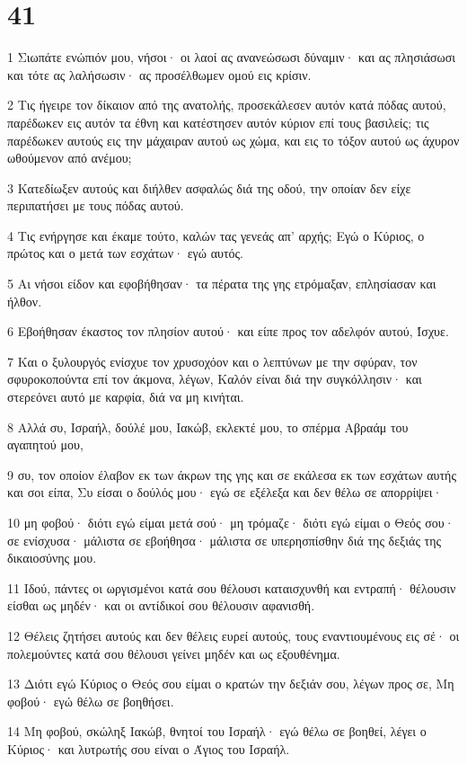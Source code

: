 \chapter{41}

\par 1 Σιωπάτε ενώπιόν μου, νήσοι· οι λαοί ας ανανεώσωσι δύναμιν· και ας πλησιάσωσι και τότε ας λαλήσωσιν· ας προσέλθωμεν ομού εις κρίσιν.
\par 2 Τις ήγειρε τον δίκαιον από της ανατολής, προσεκάλεσεν αυτόν κατά πόδας αυτού, παρέδωκεν εις αυτόν τα έθνη και κατέστησεν αυτόν κύριον επί τους βασιλείς; τις παρέδωκεν αυτούς εις την μάχαιραν αυτού ως χώμα, και εις το τόξον αυτού ως άχυρον ωθούμενον από ανέμου;
\par 3 Κατεδίωξεν αυτούς και διήλθεν ασφαλώς διά της οδού, την οποίαν δεν είχε περιπατήσει με τους πόδας αυτού.
\par 4 Τις ενήργησε και έκαμε τούτο, καλών τας γενεάς απ' αρχής; Εγώ ο Κύριος, ο πρώτος και ο μετά των εσχάτων· εγώ αυτός.
\par 5 Αι νήσοι είδον και εφοβήθησαν· τα πέρατα της γης ετρόμαξαν, επλησίασαν και ήλθον.
\par 6 Εβοήθησαν έκαστος τον πλησίον αυτού· και είπε προς τον αδελφόν αυτού, Ίσχυε.
\par 7 Και ο ξυλουργός ενίσχυε τον χρυσοχόον και ο λεπτύνων με την σφύραν, τον σφυροκοπούντα επί τον άκμονα, λέγων, Καλόν είναι διά την συγκόλλησιν· και στερεόνει αυτό με καρφία, διά να μη κινήται.
\par 8 Αλλά συ, Ισραήλ, δούλέ μου, Ιακώβ, εκλεκτέ μου, το σπέρμα Αβραάμ του αγαπητού μου,
\par 9 συ, τον οποίον έλαβον εκ των άκρων της γης και σε εκάλεσα εκ των εσχάτων αυτής και σοι είπα, Συ είσαι ο δούλός μου· εγώ σε εξέλεξα και δεν θέλω σε απορρίψει·
\par 10 μη φοβού· διότι εγώ είμαι μετά σού· μη τρόμαζε· διότι εγώ είμαι ο Θεός σου· σε ενίσχυσα· μάλιστα σε εβοήθησα· μάλιστα σε υπερησπίσθην διά της δεξιάς της δικαιοσύνης μου.
\par 11 Ιδού, πάντες οι ωργισμένοι κατά σου θέλουσι καταισχυνθή και εντραπή· θέλουσιν είσθαι ως μηδέν· και οι αντίδικοί σου θέλουσιν αφανισθή.
\par 12 Θέλεις ζητήσει αυτούς και δεν θέλεις ευρεί αυτούς, τους εναντιουμένους εις σέ· οι πολεμούντες κατά σου θέλουσι γείνει μηδέν και ως εξουθένημα.
\par 13 Διότι εγώ Κύριος ο Θεός σου είμαι ο κρατών την δεξιάν σου, λέγων προς σε, Μη φοβού· εγώ θέλω σε βοηθήσει.
\par 14 Μη φοβού, σκώληξ Ιακώβ, θνητοί του Ισραήλ· εγώ θέλω σε βοηθεί, λέγει ο Κύριος· και λυτρωτής σου είναι ο Άγιος του Ισραήλ.
